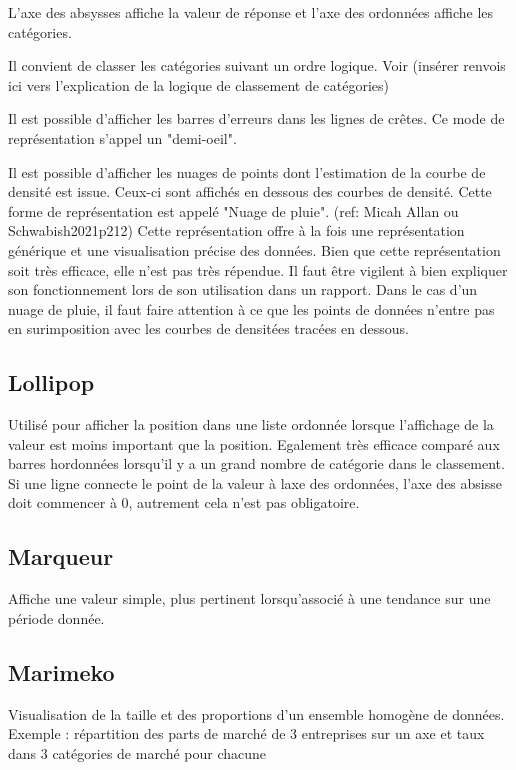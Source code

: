 \documentclass[a4paper,12pt]{article}
\begin{document}
\begin{multicols}{2}
L'axe des absysses affiche la valeur de réponse et l'axe des ordonnées affiche les catégories. \autocite{wilkeVisualizingManyDistributions2019}

Il convient de classer les catégories suivant un ordre logique. \autocite{jonathanschwabishDistribution2021} Voir (insérer renvois ici vers l'explication de la logique de classement de catégories)

Il est possible d'afficher les barres d'erreurs dans les lignes de crêtes. Ce mode de représentation s'appel un "demi-oeil". \autocite{wilkeVisualizingUncertainty2019}

Il est possible d'afficher les nuages de points dont l'estimation de la courbe de densité est issue. Ceux-ci sont affichés en dessous des courbes de densité. Cette forme de représentation est appelé "Nuage de pluie". (ref: Micah Allan ou Schwabish2021p212) Cette représentation offre à la fois une représentation générique et une visualisation précise des données. \autocite{jonathanschwabishDistribution2021} Bien que cette représentation soit très efficace, elle n'est pas très répendue. \autocite{jonathanschwabishDistribution2021} Il faut être vigilent à bien expliquer son fonctionnement lors de son utilisation dans un rapport. Dans le cas d'un nuage de pluie, il faut faire attention à ce que les points de données n'entre pas en surimposition avec les courbes de densitées tracées en dessous.
\subsection*{Lollipop}
\label{sec:orgb95c629}
Utilisé pour afficher la position dans une liste ordonnée lorsque l'affichage de la valeur est moins important que la position. \autocite{alansmithLexiqueVisuel} Egalement très efficace comparé aux barres hordonnées lorsqu'il y a un grand nombre de catégorie dans le classement. \autocite{mikeyiHowChooseRight2020}  Si une ligne connecte le point de la valeur à laxe des ordonnées, l'axe des absisse doit commencer à 0, autrement cela n'est pas obligatoire.
\subsection*{Marqueur}
\label{sec:org95ad1eb}
Affiche une valeur simple, plus pertinent lorsqu'associé à une tendance sur une période donnée. \autocite{mikeyiHowChooseRight2020}
\subsection*{Marimeko}
\label{sec:orgb6c7956}
Visualisation de la taille et des proportions d'un ensemble homogène de données. \autocite{alansmithLexiqueVisuel}
Exemple : répartition des parts de marché de 3 entreprises sur un axe et taux dans 3 catégories de marché pour chacune


\end{multicols}
\end{document}

